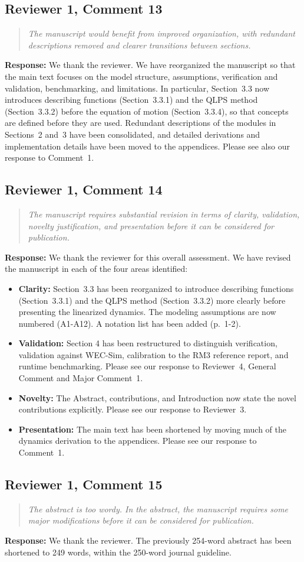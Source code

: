 \documentclass[11pt]{article}
\newcommand{\rcomment}[2]{\subsection*{#1}\begin{quote}\itshape #2\end{quote}}
\newcommand{\response}{\noindent\textbf{Response:} }
\begin{document}
\rcomment{Reviewer 1, Comment 13}{The manuscript would benefit from improved organization, with redundant descriptions removed and clearer transitions between sections.}
\response We thank the reviewer. We have reorganized the manuscript so that the main text focuses on the model structure, assumptions, verification and validation, benchmarking, and limitations. In particular, Section~3.3 now introduces describing functions (Section~3.3.1) and the QLPS method (Section~3.3.2) before the equation of motion (Section~3.3.4), so that concepts are defined before they are used. Redundant descriptions of the modules in Sections~2 and~3 have been consolidated, and detailed derivations and implementation details have been moved to the appendices. Please see also our response to Comment~1.

\rcomment{Reviewer 1, Comment 14}{The manuscript requires substantial revision in terms of clarity, validation, novelty justification, and presentation before it can be considered for publication.}
\response We thank the reviewer for this overall assessment. We have revised the manuscript in each of the four areas identified:
\begin{itemize}
  \item \textbf{Clarity:} Section~3.3 has been reorganized to introduce describing functions (Section~3.3.1) and the QLPS method (Section~3.3.2) more clearly before presenting the linearized dynamics. The modeling assumptions are now numbered (A1-A12). A notation list has been added (p.~1-2).
  \item \textbf{Validation:} Section 4 has been restructured to distinguish verification, validation against WEC-Sim, calibration to the RM3 reference report, and runtime benchmarking.
  Please see our response to Reviewer~4, General Comment and Major Comment~1.
  \item \textbf{Novelty:}
  The Abstract, contributions, and Introduction now state the novel contributions explicitly.
  Please see our response to Reviewer~3.
  \item \textbf{Presentation:} The main text has been shortened by moving much of the dynamics derivation to the appendices.
  Please see our response to Comment~1.
\end{itemize}

\rcomment{Reviewer 1, Comment 15}{The abstract is too wordy. In the abstract, the manuscript requires some major modifications before it can be considered for publication.}
\response We thank the reviewer.
The previously 254-word abstract has been shortened to 249 words, within the 250-word journal guideline.
\end{document}
